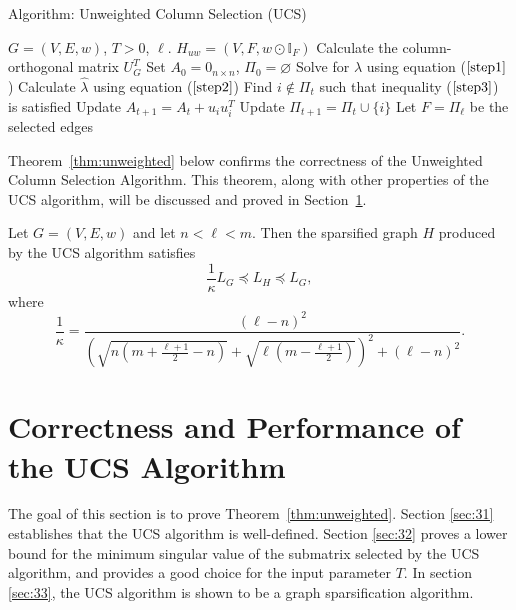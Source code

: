 \documentclass[final,leqno,onefignum,onetabnum]{siamltex1213}
\begin{document}
\begin{algorithm}
{\sc Algorithm: Unweighted Column Selection (UCS)}

\renewcommand{\algorithmicrequire}{\textbf{Inputs:}}
\renewcommand{\algorithmicensure}{\textbf{Outputs:}}
\renewcommand{\algorithmicprint}{\textbf{break}}
    \label{algo:unweighted}
    \begin{algorithmic}[1]
    \REQUIRE $G=\left( V, E, w \right)$, $T > 0$, $\ell$.
    \ENSURE $H_{uw} = \left( V, F, w \odot \mathbb{I}_F \right)$
    \STATE Calculate the column-orthogonal matrix $U_G^T$
    \STATE Set $A_0=0_{n \times n}$, $\Pi_0=\varnothing$
        \STATE Solve for $\lambda$ using equation ($\ref{step1}$)
        \STATE Calculate $\widehat{\lambda}$ using equation ($\ref{step2}$)
        \STATE Find $i\not\in \Pi_t$ such that inequality ($\ref{step3}$) is satisfied \label{find_i}
        \STATE Update $A_{t+1}=A_t+{u}_i{u}_i^T$
        \STATE Update $\Pi_{t+1}=\Pi_t\cup\{i\}$
    \ENDFOR
		\STATE Let $F=\Pi_{\ell}$ be the selected edges
    \end{algorithmic}
\end{algorithm}

Theorem~\ref{thm:unweighted} below confirms the correctness of the Unweighted Column Selection Algorithm. This theorem, along with other properties of 
the UCS algorithm, will be discussed and proved in Section~\ref{Sec:Properties}.
\begin{theorem} \label{thm:unweighted}
Let $G=\left(V,E,w\right)$ and let $n < \ell < m$. Then the sparsified graph $H$ produced by 
the UCS algorithm satisfies
\begin{equation}\frac{1}{\kappa} L_G \preceq L_H \preceq L_G ,\nonumber
\end{equation}
where 
\begin{equation}\label{Eqn:alpha}
\frac{1}{\kappa} = \frac{\left(\ell-n\right)^2}{{\left(\sqrt{n\left(m+\frac{\ell+1}{2}-n\right)}+\sqrt{\ell\left(m-\frac{\ell+1}{2}\right)}\right)^2+(\ell-n)^2}}.
\end{equation}
\end{theorem}
 


\section{Correctness and Performance of the UCS Algorithm}\label{Sec:Properties}
The goal of this section is to prove Theorem~\ref{thm:unweighted}.  Section \ref{sec:31} establishes that the UCS algorithm is well-defined.  Section \ref{sec:32} proves a lower bound for the minimum singular value of the submatrix selected by the UCS algorithm, and provides a good choice for the input parameter $T$.  In section \ref{sec:33}, the UCS algorithm is shown to be a graph sparsification algorithm.
\end{document}
